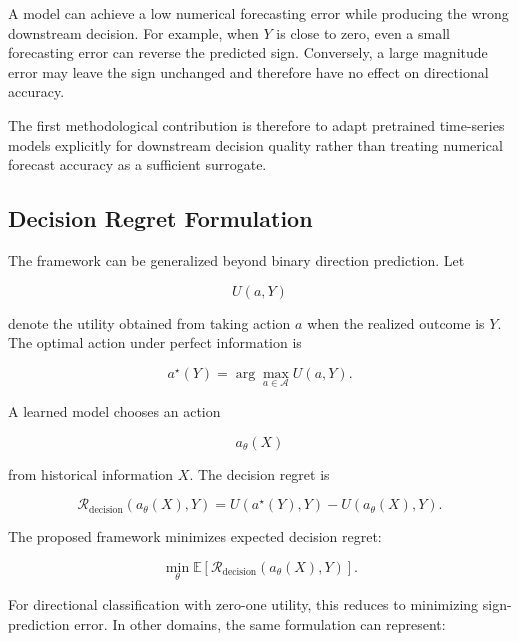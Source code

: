 \documentclass[11pt]{article}
\newcommand{\E}{\mathbb{E}}
\begin{document}
A model can achieve a low numerical forecasting error while producing the
wrong downstream decision. For example, when $Y$ is close to zero, even a
small forecasting error can reverse the predicted sign. Conversely, a large
magnitude error may leave the sign unchanged and therefore have no effect on
directional accuracy.

The first methodological contribution is therefore to adapt pretrained
time-series models explicitly for downstream decision quality rather than
treating numerical forecast accuracy as a sufficient surrogate.

\subsection{Decision Regret Formulation}

The framework can be generalized beyond binary direction prediction. Let

\begin{equation}
U(a,Y)
\end{equation}

denote the utility obtained from taking action $a$ when the realized outcome is
$Y$. The optimal action under perfect information is

\begin{equation}
a^\star(Y)
=
\arg\max_{a\in\mathcal A}
U(a,Y).
\end{equation}

A learned model chooses an action

\begin{equation}
a_\theta(X)
\end{equation}

from historical information $X$. The decision regret is

\begin{equation}
\mathcal{R}_{\mathrm{decision}}
\left(
a_\theta(X),Y
\right)
=
U\left(a^\star(Y),Y\right)
-
U\left(a_\theta(X),Y\right).
\end{equation}

The proposed framework minimizes expected decision regret:

\begin{equation}
\min_\theta
\E
\left[
\mathcal{R}_{\mathrm{decision}}
\left(
a_\theta(X),Y
\right)
\right].
\end{equation}

For directional classification with zero-one utility, this reduces to
minimizing sign-prediction error. In other domains, the same formulation can
represent:
\end{document}
